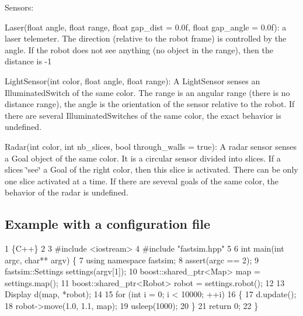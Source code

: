 Sensors\+:
\begin{DoxyItemize}
\item {\ttfamily Laser(float angle, float range, float gap\+\_\+dist = 0.\+0f, float gap\+\_\+angle = 0.\+0f)}\+: a laser telemeter. The direction (relative to the robot frame) is controlled by the {\ttfamily angle}. If the robot does not see anything (no object in the range), then the distance is -\/1
\item {\ttfamily Light\+Sensor(int color, float angle, float range)}\+: A Light\+Sensor senses an Illuminated\+Switch of the same color. The range is an angular range (there is no distance range), the angle is the orientation of the sensor relative to the robot. If there are several Illuminated\+Switches of the same color, the exact behavior is undefined.
\item {\ttfamily Radar(int color, int nb\+\_\+slices, bool through\+\_\+walls = true)}\+: A radar sensor senses a Goal object of the same color. It is a circular sensor divided into slices. If a slices \char`\"{}see\char`\"{} a Goal of the right color, then this slice is activated. There can be only one slice activated at a time. If there are seveval goals of the same color, the behavior of the radar is undefined.
\end{DoxyItemize}

\subsection*{Example with a configuration file }


\begin{DoxyCode}
1 \{C++\}
2 
3 #include <iostream>
4 #include "fastsim.hpp"
5 
6 int main(int argc, char** argv) \{
7   using namespace fastsim;
8   assert(argc == 2);
9   fastsim::Settings settings(argv[1]);
10   boost::shared\_ptr<Map> map = settings.map();
11   boost::shared\_ptr<Robot> robot = settings.robot();
12 
13   Display d(map, *robot);
14 
15   for (int i = 0; i < 10000; ++i)
16     \{
17       d.update();
18       robot->move(1.0, 1.1, map);
19       usleep(1000);
20     \}
21   return 0;
22 \}
\end{DoxyCode}


